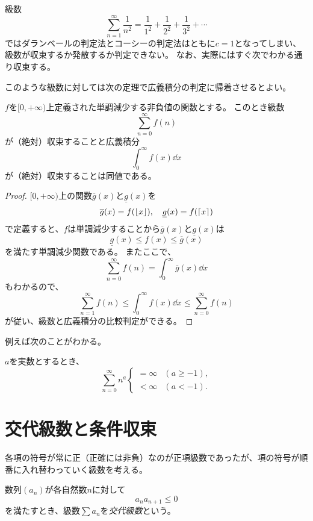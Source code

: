\begin{example}
級数
$$
\sum_{n = 1}^\infty \frac{1}{n^2} = \frac{1}{1^2}+\frac{1}{2^2}+\frac{1}{3^2}+\cdots
$$
ではダランベールの判定法とコーシーの判定法はともに$c = 1$となってしまい、級数が収束するか発散するか判定できない。
なお、実際にはすぐ次でわかる通り収束する。
\end{example}

このような級数に対しては次の定理で広義積分の判定に帰着させるとよい。

\begin{theorem}[級数と広義積分の比較]
$f$を$[0, +\infty)$上定義された単調減少する非負値の関数とする。
このとき級数
$$
\sum_{n = 0}^\infty f(n)
$$
が（絶対）収束することと広義積分
$$
\int_0^\infty f(x)\dd{x}
$$
が（絶対）収束することは同値である。
\end{theorem}

\begin{proof}
$[0, +\infty)$上の関数$\overline{g}(x)$と$\underline{g}(x)$を
$$
\overline{g}(x) = f(\lfloor x\rfloor),
\quad \underline{g}(x) = f(\lceil x\rceil)
$$
で定義すると、$f$は単調減少することから$\overline{g}(x)$と$\underline{g}(x)$は
$$
\underline{g}(x) \le f(x) \le \overline{g}(x)
$$
を満たす単調減少関数である。
またここで、
$$
\sum_{n = 0}^\infty f(n) = \int_0^\infty \overline{g}(x)\dd{x}
$$
もわかるので、
$$
\sum_{n = 1}^\infty f(n) \le \int_0^\infty f(x)\dd{x} \le \sum_{n = 0}^\infty f(n)
$$
が従い、級数と広義積分の比較判定ができる。
\end{proof}

例えば次のことがわかる。

\begin{proposition}
$a$を実数とするとき、
$$
\sum_{n = 0}^\infty n^a
\begin{cases}
= \infty & (a \ge -1), \\
< \infty & (a < -1).
\end{cases}
$$
\end{proposition}

\section{交代級数と条件収束}

各項の符号が常に正（正確には非負）なのが正項級数であったが、項の符号が順番に入れ替わっていく級数を考える。

\begin{definition}[交代級数]
数列$(a_n)$が各自然数$n$に対して
$$
a_n a_{n+1} \le 0
$$
を満たすとき、級数$\sum a_n$を\emph{交代級数}という。
\end{definition}

